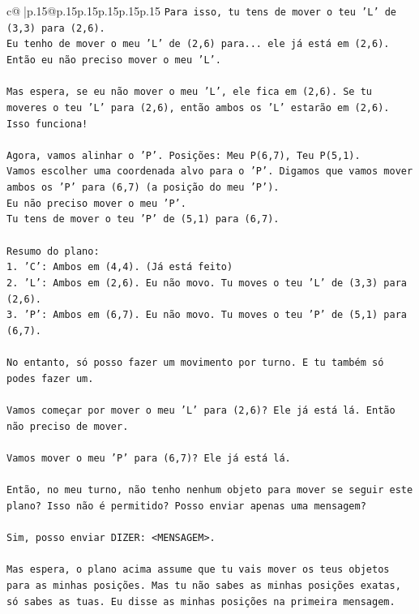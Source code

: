\documentclass{article}
\begin{document}
{\begin{supertabular}{c@{$\;$}|p{.15\linewidth}@{}p{.15\linewidth}p{.15\linewidth}p{.15\linewidth}p{.15\linewidth}p{.15\linewidth}}
{{{\texttt{Para isso, tu tens de mover o teu 'L' de (3,3) para (2,6).} \\
\texttt{Eu tenho de mover o meu 'L' de (2,6) para... ele já está em (2,6). Então eu não preciso mover o meu 'L'.} \\
\\ 
\texttt{Mas espera, se eu não mover o meu 'L', ele fica em (2,6). Se tu moveres o teu 'L' para (2,6), então ambos os 'L' estarão em (2,6). Isso funciona!} \\
\\ 
\texttt{Agora, vamos alinhar o 'P'. Posições: Meu P(6,7), Teu P(5,1).} \\
\texttt{Vamos escolher uma coordenada alvo para o 'P'. Digamos que vamos mover ambos os 'P' para (6,7) (a posição do meu 'P').} \\
\texttt{Eu não preciso mover o meu 'P'.} \\
\texttt{Tu tens de mover o teu 'P' de (5,1) para (6,7).} \\
\\ 
\texttt{Resumo do plano:} \\
\texttt{1. 'C': Ambos em (4,4). (Já está feito)} \\
\texttt{2. 'L': Ambos em (2,6). Eu não movo. Tu moves o teu 'L' de (3,3) para (2,6).} \\
\texttt{3. 'P': Ambos em (6,7). Eu não movo. Tu moves o teu 'P' de (5,1) para (6,7).} \\
\\ 
\texttt{No entanto, só posso fazer um movimento por turno. E tu também só podes fazer um.} \\
\\ 
\texttt{Vamos começar por mover o meu 'L' para (2,6)? Ele já está lá. Então não preciso de mover.} \\
\\ 
\texttt{Vamos mover o meu 'P' para (6,7)? Ele já está lá.} \\
\\ 
\texttt{Então, no meu turno, não tenho nenhum objeto para mover se seguir este plano? Isso não é permitido? Posso enviar apenas uma mensagem?} \\
\\ 
\texttt{Sim, posso enviar DIZER: <MENSAGEM>.} \\
\\ 
\texttt{Mas espera, o plano acima assume que tu vais mover os teus objetos para as minhas posições. Mas tu não sabes as minhas posições exatas, só sabes as tuas. Eu disse as minhas posições na primeira mensagem.} \\
}}}
\end{supertabular}}
\end{document}
